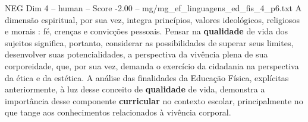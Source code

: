 \begin{textsample}{NEG Dim 4 – human – Score -2.00 – mg/mg\_ef\_linguagens\_ed\_fis\_4\_p6.txt}  \label{ex:f4_neg_011}
A dimensão espiritual, por sua vez, integra princípios, valores ideológicos, religiosos e morais : fé, crenças e convicções pessoais.
Pensar na \textbf{qualidade} de vida dos sujeitos significa, portanto, considerar as possibilidades de superar seus limites, desenvolver suas potencialidades, a perspectiva da vivência plena de sua corporeidade, que, por sua vez, demanda o exercício da cidadania na perspectiva da ética e da estética.
A análise das finalidades da Educação Física, explícitas anteriormente, à luz desse conceito de \textbf{qualidade} de vida, demonstra a importância desse componente \textbf{curricular} no contexto escolar, principalmente no que tange aos conhecimentos relacionados à vivência corporal.

\end{textsample}

